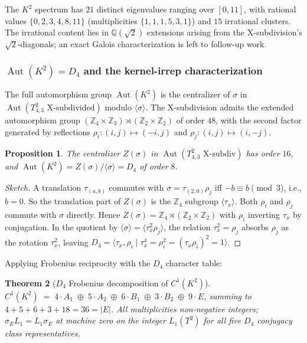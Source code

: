 \documentclass[12pt,a4paper]{article}
\newtheorem{theorem}{Theorem}[section]
\newtheorem{proposition}[theorem]{Proposition}
\theoremstyle{definition}
\theoremstyle{remark}
\newcommand{\bZ}{\mathbb{Z}}
\newcommand{\bQ}{\mathbb{Q}}                %
\DeclareMathOperator{\Aut}{Aut}
\begin{document}
The $K^2$ spectrum has $21$ distinct eigenvalues ranging over
$[0, 11]$, with rational values $\{0, 2, 3, 4, 8, 11\}$ (multiplicities
$\{1, 1, 1, 5, 3, 1\}$) and $15$ irrational clusters. The irrational
content lies in $\bQ(\sqrt 2)$ extensions arising from the
X-subdivision's $\sqrt 2$-diagonals; an exact Galois characterization
is left to follow-up work.

\subsubsection{$\Aut(K^2) = D_4$ and the kernel-irrep characterization}\label{sec:klein-aut}

The full automorphism group $\Aut(K^2)$ is the centralizer of $\sigma$
in $\Aut(T^2_{4,3} \text{ X-subdivided})$ modulo $\langle \sigma \rangle$.
The X-subdivision admits the extended automorphism group
$(\bZ_4 \times \bZ_3) \rtimes (\bZ_2 \times \bZ_2)$ of order $48$, with
the second factor generated by reflections
$\rho_i\colon (i, j) \mapsto (-i, j)$ and
$\rho_j\colon (i, j) \mapsto (i, -j)$.

\begin{proposition}\label{prop:aut-klein}
The centralizer $Z(\sigma)$ in $\Aut(T^2_{4,3} \text{ X-subdiv})$ has
order $16$, and $\Aut(K^2) = Z(\sigma) / \langle \sigma \rangle = D_4$ of
order $8$.
\end{proposition}

\begin{proof}[Sketch]
A translation $\tau_{(a, b)}$ commutes with $\sigma = \tau_{(2, 0)} \rho_j$
iff $-b \equiv b \pmod 3$, i.e., $b = 0$. So the translation part of
$Z(\sigma)$ is the $\bZ_4$ subgroup $\langle \tau_x \rangle$. Both
$\rho_i$ and $\rho_j$ commute with $\sigma$ directly. Hence
$Z(\sigma) = \bZ_4 \rtimes (\bZ_2 \times \bZ_2)$ with $\rho_i$ inverting
$\tau_x$ by conjugation. In the quotient by $\langle \sigma \rangle =
\langle \tau_x^2 \rho_j \rangle$, the relation $\tau_x^2 = \rho_j$
absorbs $\rho_j$ as the rotation $\tau_x^2$, leaving
$D_4 = \langle \tau_x, \rho_i \mid \tau_x^4 = \rho_i^2 = (\tau_x \rho_i)^2 = 1 \rangle$.
\end{proof}

Applying Frobenius reciprocity with the $D_4$ character table:

\begin{theorem}[$D_4$ Frobenius decomposition of $C^1(K^2)$]\label{thm:klein-frob}
$C^1(K^2) \;=\; 4 \cdot A_1 \;\oplus\; 5 \cdot A_2 \;\oplus\; 6 \cdot B_1
\;\oplus\; 3 \cdot B_2 \;\oplus\; 9 \cdot E$, summing to
$4 + 5 + 6 + 3 + 18 = 36 = |E|$. All multiplicities non-negative
integers; $\sigma_E L_1 = L_1 \sigma_E$ at machine zero on the integer
$L_1(T^2)$ for all five $D_4$ conjugacy class representatives.
\end{theorem}
\end{document}
